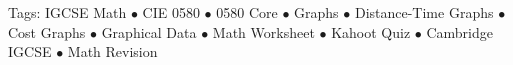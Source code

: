 \documentclass[11pt,a4paper]{article}
\begin{document}
\vspace{14pt}
\begin{center}
  \sffamily\scriptsize\textcolor{textmuted}{
    Tags: IGCSE Math $\bullet$ CIE 0580 $\bullet$ 0580 Core $\bullet$ Graphs $\bullet$ Distance-Time Graphs $\bullet$ Cost Graphs $\bullet$ Graphical Data $\bullet$ Math Worksheet $\bullet$ Kahoot Quiz $\bullet$ Cambridge IGCSE $\bullet$ Math Revision
  }
\end{center}
\end{document}
